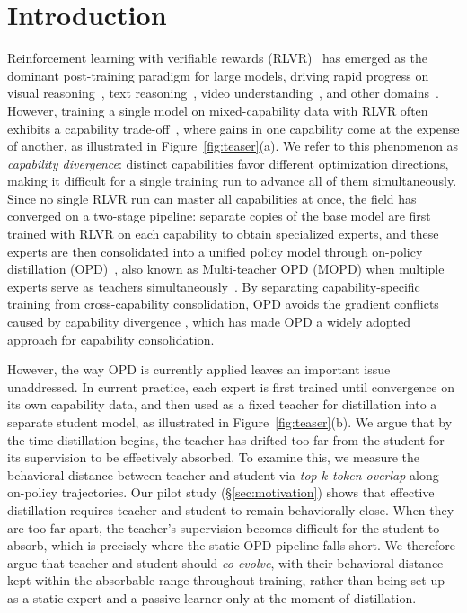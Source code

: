 \documentclass{llmxive}
\begin{document}
\section{Introduction}
Reinforcement learning with verifiable rewards (RLVR)~\cite{grpo,liu2025understandingr1zeroliketrainingcritical,yu2025dapoopensourcellmreinforcement,zheng2025groupsequencepolicyoptimization} has emerged as the dominant post-training paradigm for large models, driving rapid progress on visual reasoning~\cite{huang2026visionr1incentivizingreasoningcapability,yao2025r1sharevlincentivizingreasoningcapability}, text reasoning~\cite{deepseekr1,yang2025qwen3technicalreport}, video understanding~\cite{feng2025videor1,wang2025timer1posttraininglargevision}, and other domains~\cite{kimiteam2026kimik25visualagentic,glm5team2026glm5vibecodingagentic}. However, training a single model on mixed-capability data with RLVR often exhibits a capability trade-off~\cite{shukor2025scalinglawsoptimaldata}, where gains in one capability come at the expense of another, as illustrated in Figure~\ref{fig:teaser}(a). We refer to this phenomenon as \textit{capability divergence}: distinct capabilities favor different optimization directions, making it difficult for a single training run to advance all of them simultaneously. Since no single RLVR run can master all capabilities at once, the field has converged on a two-stage pipeline: separate copies of the base model are first trained with RLVR on each capability to obtain specialized experts, and these experts are then consolidated into a unified policy model through on-policy distillation (OPD)~\cite{lu2025onpolicy-opd}, also known as Multi-teacher OPD (MOPD) when multiple experts serve as teachers simultaneously~\cite{mimo2025flash-mopd,deepseekai2026deepseekv4}. By separating capability-specific training from cross-capability consolidation, OPD avoids the gradient conflicts caused by capability divergence
, which has made OPD a widely adopted approach for capability consolidation.


However, the way OPD is currently applied leaves an important issue unaddressed. In current practice, each expert is first trained until convergence on its own capability data, and then used as a fixed teacher for distillation into a separate student model, as illustrated in Figure~\ref{fig:teaser}(b). We argue that by the time distillation begins, the teacher has drifted too far from the student for its supervision to be effectively absorbed. To examine this, we measure the behavioral distance between teacher and student via \textit{top-$k$ token overlap} along on-policy trajectories. Our pilot study (\S\ref{sec:motivation}) shows that effective distillation requires teacher and student to remain behaviorally close. When they are too far apart, the teacher's supervision becomes difficult for the student to absorb, which is precisely where the static OPD pipeline falls short. We therefore argue that teacher and student should \textit{co-evolve}, with their behavioral distance kept within the absorbable range throughout training, rather than being set up as a static expert and a passive learner only at the moment of distillation.
\end{document}
